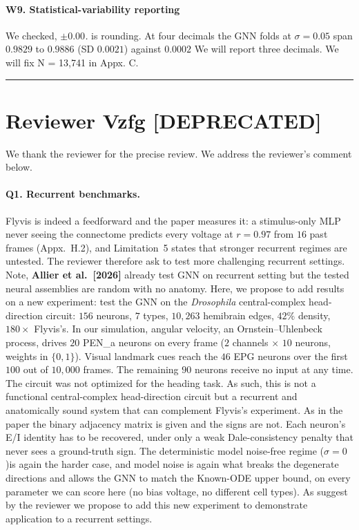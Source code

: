 \documentclass[11pt]{article}
\begin{document}
\paragraph{W9. Statistical-variability reporting}
We checked, \emph{$\pm 0.00$.} is rounding. At four decimals the GNN
folds at $\sigma = 0.05$ span $0.9829$ to $0.9886$ (SD $0.0021$) against $0.0002$
We will report three decimals. We will fix N = 13,741 in Appx. C.


\bigskip
\hrule
\bigskip

 
\section*{Reviewer Vzfg [DEPRECATED] }
We thank the reviewer for the precise review. We address the reviewer’s comment below.

\label{link8}


\paragraph{Q1. Recurrent benchmarks.}
Flyvis is indeed a feedforward and the paper measures it: a
stimulus-only MLP never seeing the connectome predicts every voltage at
$r = 0.97$ from $16$ past frames (Appx.~H.2), and Limitation~5 states that
stronger recurrent regimes are untested. The reviewer therefore ask to test more challenging recurrent settings. Note, \textbf{Allier et al.\ [2026]} already test GNN on recurrent setting but the tested neural assemblies are random with no anatomy. Here, we propose to add results on a new experiment: test the GNN on the \emph{Drosophila} central-complex head-direction circuit: $156$ neurons, $7$ types, $10{,}263$ hemibrain edges, $42\%$ density, $180\times$
Flyvis's.  In our simulation, angular velocity, an Ornstein--Uhlenbeck process, drives $20$ PEN\_a neurons on every frame ($2$ channels $\times$ $10$ neurons, weights in $\{0,1\}$). Visual landmark cues reach the $46$ EPG neurons over the first $100$ out of $10{,}000$ frames. The remaining $90$ neurons receive no input at any time. The circuit was not optimized for the heading task. As such, this is not a functional central-complex head-direction circuit but a recurrent and anatomically sound system that can complement Flyvis's experiment. As in the paper the binary adjacency matrix is given and the signs are not. Each neuron's E/I identity
has to be recovered, under only a weak Dale-consistency penalty that never sees
a ground-truth sign. The deterministic model noise-free regime ($\sigma=0$)is again the harder case, and model noise is again what breaks the degenerate directions and allows the GNN to match the Known-ODE upper bound, on every parameter we can score here (no bias voltage, no different cell types). As suggest by the reviewer we propose to add this new experiment to demonstrate application to a recurrent settings.                              
\end{document}
